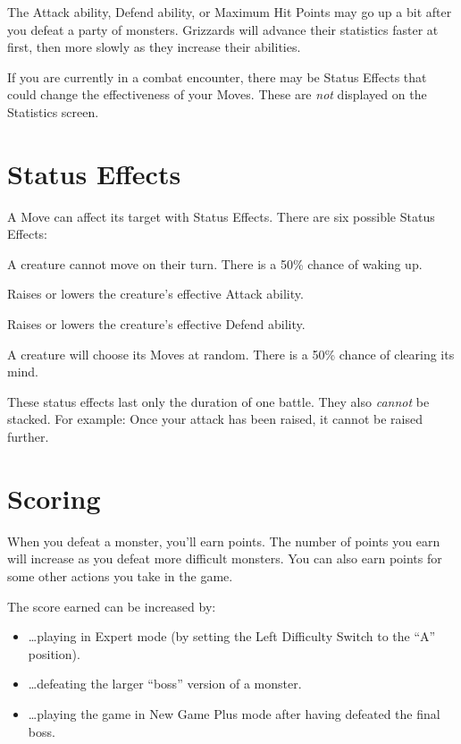 \documentclass[9pt,twocolumn,openany,article,crop]{memoir}
\newenvironment{ritemize}{\begin{itemize}\raggedright}{\end{itemize}}
\newenvironment{rdescribe}{\begin{description}\raggedright}{\end{description}}
\begin{document}
The Attack  ability, Defend  ability, or  Maximum Hit  Points may  go up
a bit after you defeat a party of monsters. Grizzards will advance their
statistics  faster  at   first,  then  more  slowly   as  they  increase
their abilities.

If you are currently in a  combat encounter, there may be Status Effects
that could change the effectiveness  of your Moves. These are \emph{not}
displayed on the Statistics screen.

\section{Status Effects}\label{sec:StatusEffects}

A Move can affect its target with Status Effects. There are six possible
Status Effects:

\begin{rdescribe}
\item[\texttt{SLEEP}] A  creature cannot  move on their turn.  There is
  a 50\% chance of waking up.
\item[\texttt{ATK UP} / \texttt{ATK DN}] Raises or lowers the creature's
  effective Attack ability.
\item[\texttt{DEF UP} / \texttt{DEF DN}] Raises or lowers the creature's
  effective Defend ability.
\item[\texttt{MUDDLE}]  A  creature will  choose  its  Moves at  random.
  There is a 50\% chance of clearing its mind.
\end{rdescribe}

These status  effects last only  the duration  of one battle.  They also
\emph{cannot} be stacked. For example: Once your attack has been raised,
it cannot be raised further.

\section{Scoring}

When you defeat a monster, you'll  earn points. The number of points you
earn will increase  as you defeat more difficult monsters.  You can also
earn points for some other actions you take in the game.

The score earned can be increased by:

\begin{ritemize}
\item \ldots{}playing  in Expert  mode (by  setting the  Left Difficulty
  Switch to the ``A'' position).
\item \ldots{}defeating the larger ``boss'' version of a monster.
\item  \ldots{}playing the  game  in  New Game  Plus  mode after  having
  defeated the final boss.
\end{ritemize}
\end{document}
